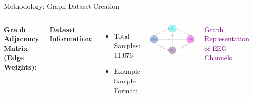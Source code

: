 \begin{frame}{Methodology: Graph Dataset Creation}

    \begin{columns}
    
        \textbf{Graph Adjacency Matrix (Edge Weights):}
        \centering
        \renewcommand{\arraystretch}{1.2}

        \vspace{8pt}

        \textbf{Dataset Information:}
        \begin{itemize}
            \item Total Samples: 11,076
            \item Example Sample Format:
        \end{itemize}

  
  
      

        \centering
        \includegraphics[width=0.85\linewidth]{images/paper_3/Graph Weightage.png} %

        {\textcolor{purple}{\small Graph Representation of EEG Channels}}

    \end{columns}
\end{frame}



